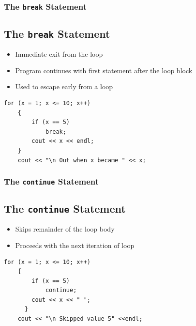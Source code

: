 \documentclass{beamer}
\begin{document}
\begin{frame} [fragile]
    \frametitle{The \texttt{break} Statement}
    \subsection{The \texttt{break} Statement} %
    \label{sub:the_break}
    \begin{itemize}
        \item Immediate exit from the loop
        \item Program continues with first statement after the loop block
        \item Used to escape early from a loop
    \end{itemize}
    \lstset{style=mystyle}
\begin{lstlisting}
for (x = 1; x <= 10; x++)
    {
        if (x == 5)
            break;
        cout << x << endl;
    }
    cout << "\n Out when x became " << x;
\end{lstlisting}
\end{frame}

\begin{frame} [fragile]
    \frametitle{The \texttt{continue} Statement}
    \subsection{The \texttt{continue} Statement} %
    \label{sub:the_continue}
    \begin{itemize}
        \item Skips remainder of the loop body
        \item Proceeds with the next iteration of loop
    \end{itemize}
    \lstset{style=mystyle}
\begin{lstlisting}
for (x = 1; x <= 10; x++)
    {
        if (x == 5)
            continue;
        cout << x << " ";
      }
    cout << "\n Skipped value 5" <<endl;
\end{lstlisting}
\end{frame}
\end{document}
